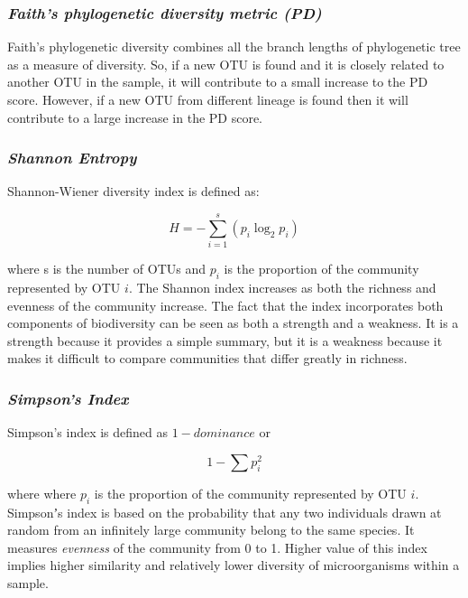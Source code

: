 \documentclass[10pt, conference, compsocconf]{IEEEtran}
\begin{document}
\subsubsection{\textit{Faith’s phylogenetic diversity metric (PD)}}
Faith’s phylogenetic diversity \cite{MARfaith1992conservation} combines all 
the branch lengths of phylogenetic tree as a measure of diversity. So, if a new 
OTU is found and it is closely related to another OTU in the sample, it will contribute to 
a small increase to the PD score. However, if a new OTU from different lineage is found then it will contribute to a large increase in the PD score.

\subsubsection{\textit{Shannon Entropy}}

Shannon-Wiener diversity index is defined as:

\begin{equation}
H={-} \sum_{i=1}^{s} \left( p_i\log_2p_i \right)
\end{equation}

where s is the number of OTUs and $p_i$ is the proportion of the community represented by OTU $i$. The Shannon index increases as both the richness and evenness of the community increase. The fact that the index incorporates both components of biodiversity can be seen as both a strength and a weakness. It is a strength because it provides a simple summary, but it is a weakness because it makes it difficult to compare communities that differ greatly in richness.


\subsubsection{\textit{Simpson's Index}}
Simpson’s index is defined as ${1-dominance}$ or

\begin{equation}
1 - \sum p_i^2
\end{equation}

where where $p_i$ is the proportion of the community represented by OTU $i$. Simpsonʼs index is based on the probability that any two individuals drawn at random from an infinitely large community belong to the same species. It measures \textit{evenness} of the community from 0 to 1. Higher value of this index implies higher similarity and relatively lower diversity of microorganisms within a sample.
\end{document}
